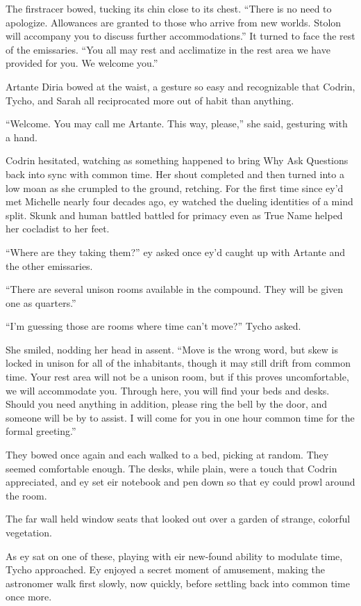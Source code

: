 The firstracer bowed, tucking its chin close to its chest. ``There is no need to apologize. Allowances are granted to those who arrive from new worlds. Stolon will accompany you to discuss further accommodations.'' It turned to face the rest of the emissaries. ``You all may rest and acclimatize in the rest area we have provided for you. We welcome you.''

Artante Diria bowed at the waist, a gesture so easy and recognizable that Codrin, Tycho, and Sarah all reciprocated more out of habit than anything.

``Welcome. You may call me Artante. This way, please,'' she said, gesturing with a hand.

Codrin hesitated, watching as something happened to bring Why Ask Questions back into sync with common time. Her shout completed and then turned into a low moan as she crumpled to the ground, retching. For the first time since ey'd met Michelle nearly four decades ago, ey watched the dueling identities of a mind split. Skunk and human battled battled for primacy even as True Name helped her cocladist to her feet.

``Where are they taking them?'' ey asked once ey'd caught up with Artante and the other emissaries.

``There are several unison rooms available in the compound. They will be given one as quarters.''

``I'm guessing those are rooms where time can't move?'' Tycho asked.

She smiled, nodding her head in assent. ``Move is the wrong word, but skew is locked in unison for all of the inhabitants, though it may still drift from common time. Your rest area will not be a unison room, but if this proves uncomfortable, we will accommodate you. Through here, you will find your beds and desks. Should you need anything in addition, please ring the bell by the door, and someone will be by to assist. I will come for you in one hour common time for the formal greeting.''

They bowed once again and each walked to a bed, picking at random. They seemed comfortable enough. The desks, while plain, were a touch that Codrin appreciated, and ey set eir notebook and pen down so that ey could prowl around the room.

The far wall held window seats that looked out over a garden of strange, colorful vegetation.

As ey sat on one of these, playing with eir new-found ability to modulate time, Tycho approached. Ey enjoyed a secret moment of amusement, making the astronomer walk first slowly, now quickly, before settling back into common time once more.

